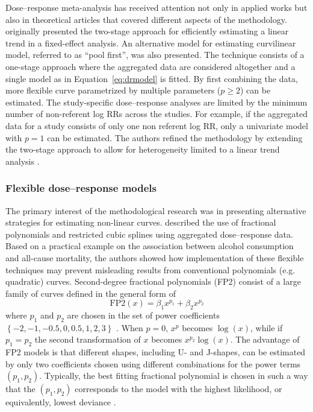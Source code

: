 \documentclass[11pt,a4paper,twoside,openany]{book}\usepackage{knitr}
\begin{document}
{{Dose--response meta-analysis has received attention not only in applied works but also in theoretical articles that covered different aspects of the methodology. 
\noindent \cite{greenland1992methods} originally presented the two-stage approach for efficiently estimating a linear trend in a fixed-effect analysis. An alternative model for estimating curvilinear model, referred to as ``pool first'', was also presented. The technique consists of a one-stage approach where the aggregated data are considered altogether and a single model as in Equation~\ref{eq:drmodel} is fitted. By first combining the data, more flexible curve parametrized by multiple parameters ($p \ge 2$) can be estimated. The study-specific dose--response analyses are limited by the minimum number of non-referent log RRs across the studies. For example, if the aggregated data for a study consists of only one non referent log RR, only a univariate model with $p = 1$ can be estimated. The authors refined the methodology by extending the two-stage approach to allow for heterogeneity limited to a linear trend analysis \citep{berlin1993meta}. 

\subsubsection*{Flexible dose--response models}

The primary interest of the methodological research was in presenting alternative strategies for estimating non-linear curves. \cite{bagnardi2004flexible} described the use of fractional polynomials and restricted cubic splines using aggregated dose--response data. Based on a practical example on the association between alcohol consumption and all-cause mortality, the authors showed how implementation of these flexible techniques may prevent misleading results from conventional polynomials (e.g. quadratic) curves. 
Second-degree fractional polynomials (FP2) consist of a large family of curves defined in the general form of
\begin{equation}
\mathrm{FP2}(x) = \beta_1 x^{p_1} + \beta_2x^{p_2}
\label{eq:fracpol}
\end{equation}
\noindent where $p_1$ and $p_2$ are chosen in the set of power coefficients $\left\{-2, -1, -0.5, 0, 0.5, 1, 2, 3 \right\}$ \citep{royston1994regression, royston2000strategy}. When $p = 0$, $x^p$ becomes $\log(x)$, while if $p_1 = p_2$ the second transformation of $x$ becomes $x^{p_2}\log(x)$. The advantage of FP2 models is that different shapes, including U- and J-shapes, can be estimated by only two coefficients chosen using different combinations for the power terms $(p_1, p_2)$. Typically, the best fitting fractional polynomial is chosen in such a way that the $(p_1, p_2)$ corresponds to the model with the highest likelihood, or equivalently, lowest deviance \citep{royston2001flexible}. 

}}
\end{document}
